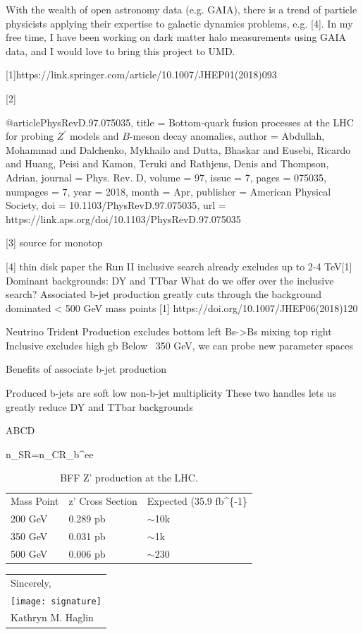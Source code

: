 \documentclass[11pt]{article}
\begin{document}
With the wealth of open astronomy data (e.g. GAIA), there is a trend of particle physicists applying their expertise to galactic dynamics problems, e.g. [4]. In my free time, I have been working on dark matter halo measurements using GAIA data, and I would love to bring this project to UMD.

 
 [1]https://link.springer.com/article/10.1007/JHEP01(2018)093
 
 
 [2]

@article{PhysRevD.97.075035,
  title = {Bottom-quark fusion processes at the LHC for probing ${Z}^{\ensuremath{'}}$ models and $B$-meson decay anomalies},
  author = {Abdullah, Mohammad and Dalchenko, Mykhailo and Dutta, Bhaskar and Eusebi, Ricardo and Huang, Peisi and Kamon, Teruki and Rathjens, Denis and Thompson, Adrian},
  journal = {Phys. Rev. D},
  volume = {97},
  issue = {7},
  pages = {075035},
  numpages = {7},
  year = {2018},
  month = {Apr},
  publisher = {American Physical Society},
  doi = {10.1103/PhysRevD.97.075035},
  url = {https://link.aps.org/doi/10.1103/PhysRevD.97.075035}
}

[3] source for monotop


[4] thin disk paper
the Run II inclusive search already excludes up to 2-4 TeV[1]
Dominant backgrounds: DY and TTbar
What do we offer over the inclusive search? 
Associated b-jet production greatly cuts through the background dominated < 500 GeV mass points
[1] https://doi.org/10.1007/JHEP06(2018)120


Neutrino Trident Production excludes bottom left
Bs->Bs mixing top right
Inclusive excludes high gb
Below ~350 GeV, we can probe new parameter spaces

Benefits of associate b-jet production

Produced b-jets are soft
low non-b-jet multiplicity
These two handles lets us greatly reduce DY and TTbar backgrounds

ABCD

n_{SR}=n_{CR_{b}^{ee}}


\begin{table}[]
\begin{tabular}{lll}
Mass Point & z' Cross Section & Expected (35.9 fb\textasciicircum{}\{-1\} \\
200 GeV    & 0.289 pb         & $\sim$10k                                \\
350 GeV    & 0.031 pb         & $\sim$1k                                 \\
500 GeV    & 0.006 pb         & $\sim$230                                
\end{tabular}
\caption{BFF Z' production at the LHC.}
\end{table}



\bigskip

\begin{tabular}{@{}l@{}}
Sincerely, \\
  [.4em]
 \texttt{[image: signature]}\\ %
  [.2em]
  Kathryn M. Haglin
\end{tabular}
\end{document}
